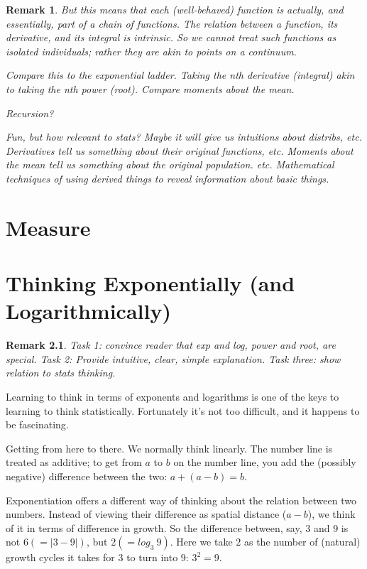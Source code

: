 \documentclass[reqno,12pt]{tufte-book}
\numberwithin{equation}{subsection}
\newtheorem{remark}{Remark}
\begin{document}
\begin{remark}
  But this means that each (well-behaved) function is actually, and
  essentially, part of a chain of functions.  The relation between a
  function, its derivative, and its integral is intrinsic.  So we
  cannot treat such functions as isolated individuals; rather they are
  akin to points on a continuum.

  Compare this to the exponential ladder.  Taking the nth derivative
  (integral) akin to taking the nth power (root).  Compare moments
  about the mean.

  Recursion?

  Fun, but how relevant to stats?  Maybe it will give us intuitions
  about distribs, etc.  Derivatives tell us something about their
  original functions, etc.  Moments about the mean tell us something
  about the original population. etc.  Mathematical techniques of
  using derived things to reveal information about basic things.

\end{remark}

\chapter{Measure}


\chapter{Thinking Exponentially (and Logarithmically)}

\begin{remark}
  Task 1: convince reader that exp and log, power and root, are
  special.  Task 2: Provide intuitive, clear, simple explanation.
  Task three: show relation to stats thinking.
\end{remark}

Learning to think in terms of exponents and logarithms is one of the
keys to learning to think statistically.  Fortunately it's not too
difficult, and it happens to be fascinating.

Getting from here to there.  We normally think linearly.  The number
line is treated as additive; to get from $a$ to $b$ on the number
line, you add the (possibly negative) difference between the two: $a +
(a-b) = b$.

Exponentiation offers a different way of thinking about the relation
between two numbers.  Instead of viewing their difference as spatial
distance ($a-b$), we think of it in terms of difference in growth.  So
the difference between, say, $3$ and $9$ is not $6 (= |3-9|)$, but $2
(= log_3\ 9)$.  Here we take $2$ as the number of (natural) growth
cycles it takes for $3$ to turn into $9$: $3^2 = 9$.
\end{document}
